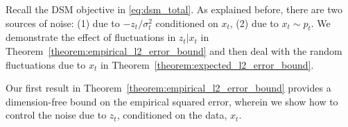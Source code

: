 Recall the DSM objective in \eqref{eq:dsm_total}. As explained before, there are two sources of noise: (1) due to $-z_{t}/\sigma_{t}^{2}$ conditioned on $x_{t}$, (2) due to $x_{t}\sim p_{t}$.  We demonstrate the effect of fluctuations in $z_{t}|x_t$ in Theorem~\ref{theorem:empirical_l2_error_bound} and then deal with the random fluctuations due to $x_t$ in Theorem~\ref{theorem:expected_l2_error_bound}. 



Our first result in Theorem~\ref{theorem:empirical_l2_error_bound} provides a dimension-free bound on the empirical squared error, wherein we show how to control the noise due to $z_{t}$, conditioned on the data, $x_{t}$. 

